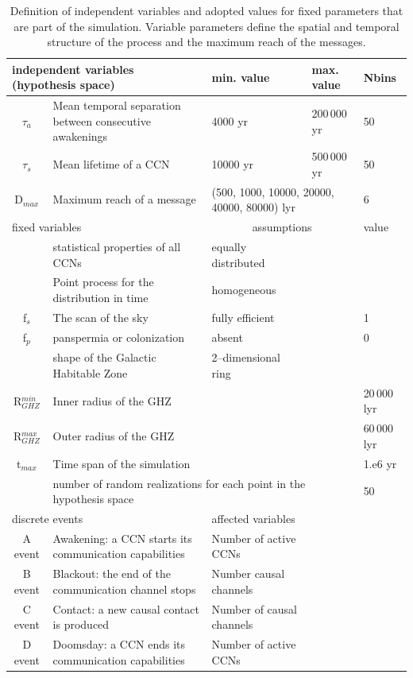 \documentclass[crop]{CSLB}
\newcommand{\ceti}{CCN}
\newcommand{\cetis}{CCNs}
\begin{document}
 \setlength{\tabcolsep}{10pt}
\begin{table}
\centering
\begin{tabular}{cllll}
\hline
   \multicolumn{2}{l}{independent variables (hypothesis space)}
   &min. value&max. value&Nbins\\
\hline
   $\tau_{a}$ & Mean temporal separation between consecutive
   awakenings & 4000 yr & 200\,000 yr & 50\\ 
   $\tau_{s}$ & Mean lifetime of a \ceti{}
   & 10000 yr & 500\,000 yr& 50\\ 
   D$_{max}$ & Maximum reach of a message  &  \multicolumn{2}{l}{(500,
   1000, 10000, 20000, 40000, 80000) lyr} & 6  \\
\hline
   \multicolumn{2}{l}{fixed variables} & \multicolumn{2}{c}{assumptions} &value \\
\hline
   & statistical properties of all \cetis{} &equally distributed&&\\
   & Point process for the distribution in time & homogeneous &&\\
   f$_s$ & The scan of the sky & fully efficient&&1\\
   f$_p$ & panspermia or colonization &absent&&0\\
   & shape of the Galactic Habitable Zone & 2--dimensional ring &&\\
   R$_{GHZ}^{min}$   & Inner radius of the GHZ     & & &20\,000 lyr\\
   R$_{GHZ}^{max}$   & Outer radius of the GHZ     &&&60\,000 lyr\\
   t$_{max}$ & Time span of the simulation  &&&1.e6 yr\\
    & \multicolumn{3}{l}{number of random realizations for each point in the hypothesis space} &50\\
\hline
   \multicolumn{2}{l}{discrete events} &
   \multicolumn{3}{l}{affected variables}\\
\hline
   A event & Awakening: a \ceti{} starts its communication
   capabilities &Number of active \cetis{}\\
   B event & Blackout: the end of the communication channel stops
   &Number causal channels\\
   C event & Contact: a new causal contact is produced &Number of causal channels\\
   D event & Doomsday: a \ceti{} ends its communication capabilities&Number of active \cetis{}\\
\hline

\hline
\end{tabular}
\caption{Definition of independent variables and adopted values for 
   fixed parameters 
   that are part of the simulation.  Variable parameters define the
   spatial and temporal structure
   of the process and the maximum reach of the messages.}
\label{T_simu_hypotheses}
\end{table}
 
\end{document}
